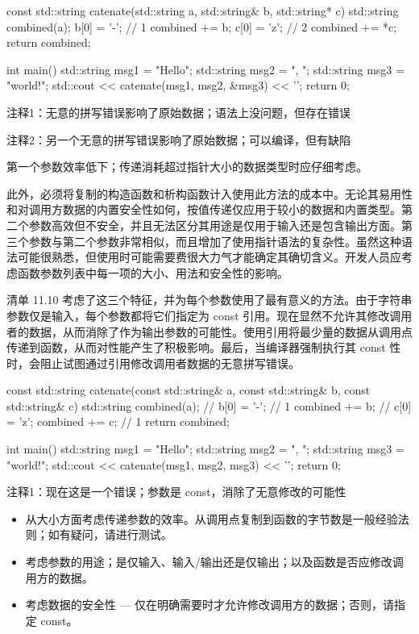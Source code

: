 
\begin{cpp}
const std::string catenate(std::string a, std::string& b, std::string* c) {
  std::string combined(a);
  b[0] = '-'; // 1
  combined += b;
  c[0] = 'z'; // 2
  combined += *c;
  return combined;
}

int main() {
  std::string msg1 = "Hello";
  std::string msg2 = ", ";
  std::string msg3 = "world!";
  std::cout << catenate(msg1, msg2, &msg3) << '\n';
  return 0;
}
\end{cpp}

{\footnotesize
注释1：无意的拼写错误影响了原始数据；语法上没问题，但存在错误

注释2：另一个无意的拼写错误影响了原始数据；可以编译，但有缺陷
}


第一个参数效率低下；传递消耗超过指针大小的数据类型时应仔细考虑。

此外，必须将复制的构造函数和析构函数计入使用此方法的成本中。无论其易用性和对调用方数据的内置安全性如何，按值传递仅应用于较小的数据和内置类型。第二个参数高效但不安全，并且无法区分其用途是仅用于输入还是包含输出方面。第三个参数与第二个参数非常相似，而且增加了使用指针语法的复杂性。虽然这种语法可能很熟悉，但使用时可能需要费很大力气才能确定其确切含义。开发人员应考虑函数参数列表中每一项的大小、用法和安全性的影响。


清单 11.10 考虑了这三个特征，并为每个参数使用了最有意义的方法。由于字符串参数仅是输入，每个参数都将它们指定为 const 引用。现在显然不允许其修改调用者的数据，从而消除了作为输出参数的可能性。使用引用将最少量的数据从调用点传递到函数，从而对性能产生了积极影响。最后，当编译器强制执行其 const 性时，会阻止试图通过引用修改调用者数据的无意拼写错误。


\begin{cpp}
const std::string catenate(const std::string& a, const std::string& b, const
std::string& c) {
  std::string combined(a);
  // b[0] = '-'; // 1
  combined += b;
  // c[0] = 'z';
  combined += c; // 1
  return combined;
}

int main() {
  std::string msg1 = "Hello";
  std::string msg2 = ", ";
  std::string msg3 = "world!";
  std::cout << catenate(msg1, msg2, msg3) << '\n';
  return 0;
}
\end{cpp}

{\footnotesize
注释1：现在这是一个错误；参数是 const，消除了无意修改的可能性
}


\begin{itemize}
\item
从大小方面考虑传递参数的效率。从调用点复制到函数的字节数是一般经验法则；如有疑问，请进行测试。

\item
考虑参数的用途；是仅输入、输入/输出还是仅输出；以及函数是否应修改调用方的数据。

\item
考虑数据的安全性 — 仅在明确需要时才允许修改调用方的数据；否则，请指定 const。
\end{itemize}









